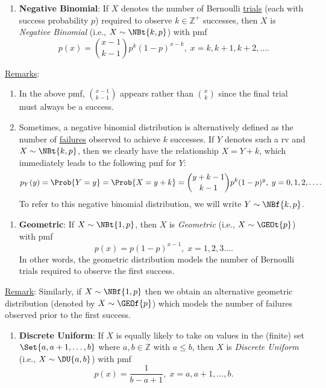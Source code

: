 \begin{Regular}
    \begin{enumerate}[3.]
        \item \textbf{Negative Binomial}: If $ X $ denotes the number of Bernoulli \underline{trials} (each with success probability $ p $)
              required to observe $ k\in\mathbb{Z}^+ $ successes, then $ X $ is \emph{Negative Binomial} (i.e., $ X \sim \NBt{k,p} $) with pmf
              \[ p(x)=\binom{x-1}{k-1}p^k(1-p)^{x-k},\; x=k,k+1,k+2,\ldots. \]
    \end{enumerate}
    \tcblower{}
    \underline{Remarks}:
    \begin{enumerate}[(1)]
        \item In the above pmf, $ \binom{x-1}{k-1} $ appears rather than $ \binom{x}{k} $ since the final trial must always be a success.
        \item Sometimes, a negative binomial distribution is alternatively defined as the number of \underline{failures} observed to achieve
              $ k $ successes. If $ Y $ denotes such a rv and $ X \sim \NBt{k,p} $, then we clearly have the relationship $ X=Y+k $, which immediately
              leads to the following pmf for $ Y $:
              \[ p_Y(y)=\Prob{Y=y}=\Prob{X=y+k}=\binom{y+k-1}{k-1}p^k (1-p)^y,\; y=0,1,2,\ldots. \]
              To refer to this negative binomial distribution, we will write $ Y \sim \NBf{k,p} $.
    \end{enumerate}
\end{Regular}
\begin{Regular}
    \begin{enumerate}[4.]
        \item \textbf{Geometric}: If $ X \sim \NBt{1,p} $, then $ X $ is \emph{Geometric} (i.e., $ X \sim \GEOt{p} $) with pmf
              \[ p(x)=p(1-p)^{x-1},\;x=1,2,3\ldots. \]
              In other words, the geometric distribution models the number of Bernoulli trials required to observe the first success.
    \end{enumerate}
    \tcblower{}
    \underline{Remark}: Similarly, if $ X \sim \NBf{1,p} $ then we obtain an alternative geometric
    distribution (denoted by $ X \sim \GEOf{p} $) which models the number of failures observed prior to the first success.
\end{Regular}
\begin{Regular}
    \begin{enumerate}[5.]
        \item \textbf{Discrete Uniform}: If $ X $ is equally likely to take on values in the (finite) set
              $ \Set{a,a+1,\ldots,b} $ where $ a,b\in\mathbb{Z} $ with $ a\le b $, then $ X $ is \emph{Discrete Uniform} (i.e., $ X \sim \DU{a,b} $)
              with pmf
              \[ p(x)=\frac{1}{b-a+1},\; x=a,a+1,\ldots,b.  \]
    \end{enumerate}
\end{Regular}

